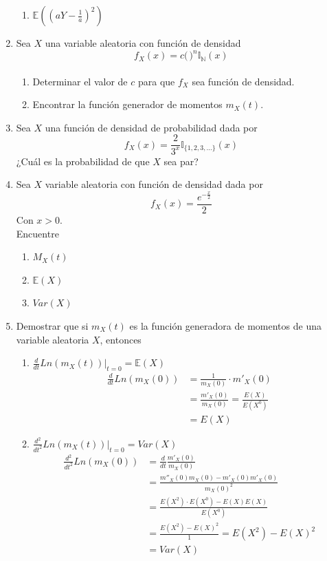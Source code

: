 \documentclass[12pt,a4paper]{report}
\begin{document}
\begin{enumerate}
{\begin{enumerate}
				\item {
					$\mathbb{E}((aY-\frac{1}{a})^2)$
				}
			\end{enumerate}
		}

		\item{
			Sea $X$ una variable aleatoria con función de densidad
			\[f_X(x) = c \Big(\frac{}{}\Big)^n \mathbb{I}_{\mathbb{N}}(x)\]
			\begin{enumerate}
				\item {
					Determinar el valor de $c$ para que $f_X$ sea función de
					densidad.
				}

				\item {
					Encontrar la función generador de momentos $m_X(t)$.
				}
			\end{enumerate}
		}

		\item{
			Sea $X$ una función de densidad de probabilidad dada por
			\[f_X(x) = \frac{2}{3^x} \mathbb{I}_{\{1, 2, 3, ...\}}(x)\]
			¿Cuál es la probabilidad de que $X$ sea par?
		}

		\item{
			Sea $X$ variable aleatoria con función de densidad dada por
			\[f_X(x) = \frac{e^{-\frac{x}{2}}}{2}\]
			Con $x > 0$.\\
			Encuentre
			\begin{enumerate}
				\item {
					$M_X(t)$
				}

				\item {
					$\mathbb{E}(X)$
				}

				\item {
					$Var(X)$
				}
			\end{enumerate}
		}

		\item{
			Demostrar que si $m_X(t)$ es la función generadora de momentos de
			una variable aleatoria $X$, entonces
			\begin{enumerate}
				\item {
				$\frac{d}{dt}Ln(m_X(t))|_{t = 0} = \mathbb{E}(X)$
				\begin{align*}
					\frac{d}{dt}Ln(m_X(0)) &= \frac{1}{m_X(0)} \cdot m'_X(0)\\
					&= \frac{m'_X(0)}{m_X(0)} = \frac{E(X)}{E(X^0)}\\
					&= E(X)
				\end{align*}
				}

				\item {
				$\frac{d^2}{dt^2}Ln(m_X(t))|_{t = 0} = Var(X)$
				\begin{align*}
					\frac{d^2}{dt^2}Ln(m_X(0)) &= \frac{d}{dt}\frac{m'_X(0)}{m_X(0)}\\
					&= \frac{m''_X(0)m_X(0)-m'_X(0)m'_X(0)}{m_X(0)^2}\\
					&= \frac{E(X^2) \cdot E(X^0) - E(X)E(X)}{E(X^0)}\\
					&= \frac{E(X^2)-E(X)^2}{1} = E(X^2)-E(X)^2 \\
					&= Var(X)
				\end{align*}
				}
			\end{enumerate}
		}


\end{enumerate}
\end{document}
